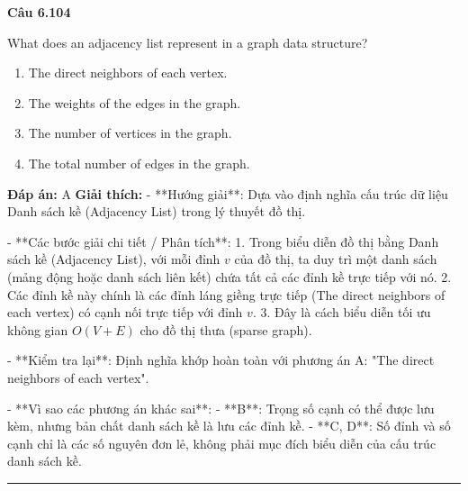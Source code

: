 \documentclass[11pt,a4paper]{article}
\newenvironment{question}[1]{%
  \par\vspace{1em}\noindent\textbf{\large Câu #1}\par\vspace{0.4em}
}{%
  \par\vspace{1em}\hrule\vspace{0.6em}
}
\newenvironment{choices}{%
  \begin{enumerate}[label=\textbf{\Alph*.},leftmargin=2.2em,itemsep=2pt,topsep=3pt]
}{%
  \end{enumerate}
}
\newcommand{\choice}{\item}
\begin{document}
\begin{question}{6.104}
What does an adjacency list represent in a graph data structure?
\begin{choices}
\choice The direct neighbors of each vertex.
\choice The weights of the edges in the graph.
\choice The number of vertices in the graph.
\choice The total number of edges in the graph.
\end{choices}
\textbf{Đáp án:} A
\textbf{Giải thích:} - **Hướng giải**:
  Dựa vào định nghĩa cấu trúc dữ liệu Danh sách kề (Adjacency List) trong lý thuyết đồ thị.

- **Các bước giải chi tiết / Phân tích**:
  1. Trong biểu diễn đồ thị bằng Danh sách kề (Adjacency List), với mỗi đỉnh \(v\) của đồ thị, ta duy trì một danh sách (mảng động hoặc danh sách liên kết) chứa tất cả các đỉnh kề trực tiếp với nó.
  2. Các đỉnh kề này chính là các đỉnh láng giềng trực tiếp (The direct neighbors of each vertex) có cạnh nối trực tiếp với đỉnh \(v\).
  3. Đây là cách biểu diễn tối ưu không gian \(O(V + E)\) cho đồ thị thưa (sparse graph).

- **Kiểm tra lại**:
  Định nghĩa khớp hoàn toàn với phương án A: "The direct neighbors of each vertex".

- **Vì sao các phương án khác sai**:
  - **B**: Trọng số cạnh có thể được lưu kèm, nhưng bản chất danh sách kề là lưu các đỉnh kề.
  - **C, D**: Số đỉnh và số cạnh chỉ là các số nguyên đơn lẻ, không phải mục đích biểu diễn của cấu trúc danh sách kề.
\end{question}
\end{document}
